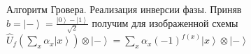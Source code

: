 \begin{figure}
\centering



\caption{Алгоритм Гровера. Реализация инверсии фазы. Приняв
  $b=\left|-\right> = \frac{\left|0\right> -
    \left|1\right>}{\sqrt{2}}$ получим для изображенной схемы
$\hat{U}_{f}\left(\sum_x \alpha_x \left|x\right>\right)\otimes\left|-\right> = 
\sum_x \alpha_x
\left(-1\right)^{f\left(x\right)}\left|x\right>\otimes\left|-\right>$} 
\label{figQuantCompGroverPhaseInvImpl}
\end{figure}
